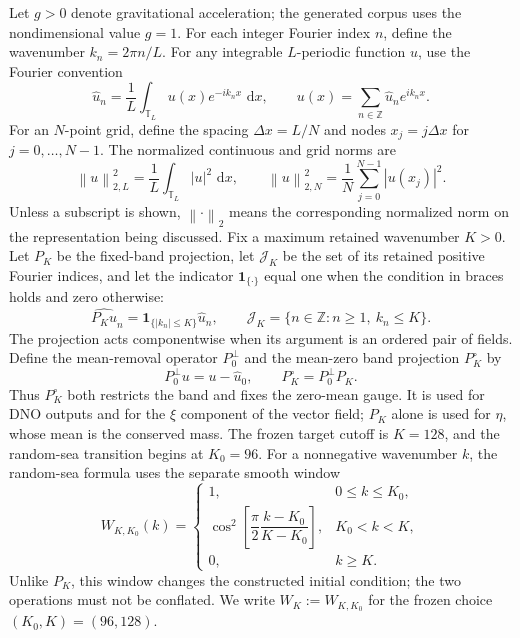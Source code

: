 \documentclass[11pt]{article}
\newcommand{\T}{\mathbb T}
\newcommand{\dd}{\,\mathrm d}
\newcommand{\norm}[1]{\left\lVert #1\right\rVert}
\begin{document}
Let $g>0$ denote gravitational acceleration; the generated corpus uses the
nondimensional value $g=1$.  For each integer Fourier index $n$, define the
wavenumber $k_n=2\pi n/L$.  For any integrable $L$-periodic function $u$, use
the Fourier convention
\begin{equation}
  \widehat u_n=\frac1L\int_{\T_L}u(x)e^{-ik_nx}\,\dd x,
  \qquad
  u(x)=\sum_{n\in\mathbb Z}\widehat u_ne^{ik_nx}.
  \label{eq:fourier-convention}
\end{equation}
For an $N$-point grid, define the spacing $\Delta x=L/N$ and nodes
$x_j=j\Delta x$ for $j=0,\ldots,N-1$.  The normalized continuous and grid
norms are
\begin{equation}
  \norm{u}_{2,L}^2=\frac1L\int_{\T_L}|u|^2\,\dd x,
  \qquad
  \norm{u}_{2,N}^2=\frac1N\sum_{j=0}^{N-1}|u(x_j)|^2.
  \label{eq:l2-conventions}
\end{equation}
Unless a subscript is shown, $\norm{\cdot}_2$ means the corresponding
normalized norm on the representation being discussed.  Fix a maximum
retained wavenumber $K>0$.  Let $P_K$ be the fixed-band projection, let
$\mathcal J_K$ be the set of its retained positive Fourier indices, and let
the indicator $\mathbf 1_{\{\cdot\}}$ equal one when the condition in braces
holds and zero otherwise:
\begin{equation}
  \widehat{P_Ku}_n=\mathbf 1_{\{|k_n|\leq K\}}\widehat u_n,
  \qquad
  \mathcal J_K=\{n\in\mathbb Z:n\geq1,\ k_n\leq K\}.
  \label{eq:fixed-band-projection}
\end{equation}
The projection acts componentwise when its argument is an ordered pair of
fields.
Define the mean-removal operator $P_0^\perp$ and the mean-zero band
projection $P_K^\circ$ by
\begin{equation}
  P_0^\perp u=u-\widehat u_0,\qquad
  P_K^\circ=P_0^\perp P_K.
  \label{eq:mean-zero-band-projection}
\end{equation}
Thus $P_K^\circ$ both restricts the band and fixes the zero-mean gauge.  It is
used for DNO outputs and for the $\xi$ component of the vector field; $P_K$
alone is used for $\eta$, whose mean is the conserved mass.
The frozen target cutoff is $K=128$, and the random-sea transition begins at
$K_0=96$.  For a nonnegative wavenumber $k$, the random-sea formula uses the
separate smooth window
\begin{equation}
  W_{K,K_0}(k)=
  \begin{cases}
    1,&0\leq k\leq K_0,\\
    \cos^2\!\left[\dfrac{\pi}{2}\dfrac{k-K_0}{K-K_0}\right],
      &K_0<k<K,\\
    0,&k\geq K.
  \end{cases}
  \label{eq:resolved-band-window}
\end{equation}
Unlike $P_K$, this window changes the constructed initial condition; the two
operations must not be conflated.  We write $W_K:=W_{K,K_0}$ for the frozen
choice $(K_0,K)=(96,128)$.
\end{document}
